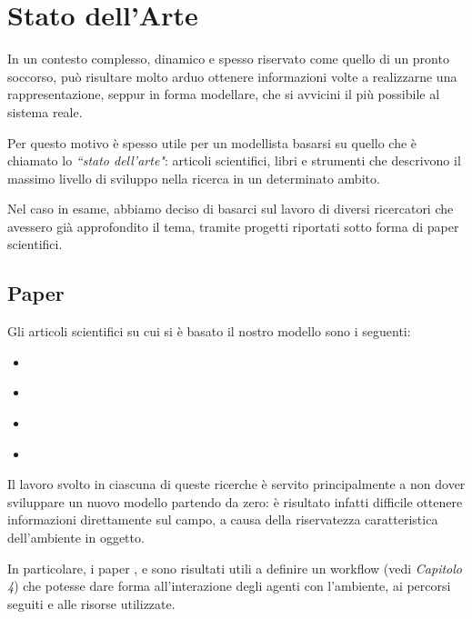 \chapter{Stato dell'Arte}

In un contesto complesso, dinamico e spesso riservato come quello di un pronto soccorso, può risultare molto arduo ottenere informazioni volte a realizzarne una rappresentazione, seppur in forma modellare, che si avvicini il più possibile al sistema reale. 
 
Per questo motivo è spesso utile per un modellista basarsi su quello che è chiamato lo \textit{``stato dell'arte"}: articoli scientifici, libri e strumenti che descrivono il massimo livello di sviluppo nella ricerca in un determinato ambito. 

Nel caso in esame, abbiamo deciso di basarci sul lavoro di diversi ricercatori che avessero già approfondito il tema, tramite progetti riportati sotto forma di paper scientifici.  

\section{Paper}

Gli articoli scientifici su cui si è basato il nostro modello sono i seguenti:
\begin{itemize}
\item \cite{garcia_reducing_1995}
\item \cite{espinoza_real-time_2014}
\item \cite{stainsby_towards_2009} 
\item  \cite{wang_agent-based_2009}
\end{itemize}


Il lavoro svolto in ciascuna di queste ricerche è servito principalmente a non dover sviluppare un nuovo modello partendo da zero: è risultato infatti difficile ottenere informazioni direttamente sul campo, a causa della riservatezza caratteristica dell'ambiente in oggetto. 

In particolare, i paper \textit{\cite{garcia_reducing_1995}}, \textit{\cite{stainsby_towards_2009}} e \textit{\cite{wang_agent-based_2009}} sono risultati utili a definire un workflow (vedi \textit{Capitolo 4}) che potesse dare forma all'interazione degli agenti con l'ambiente, ai percorsi seguiti e alle risorse utilizzate.

